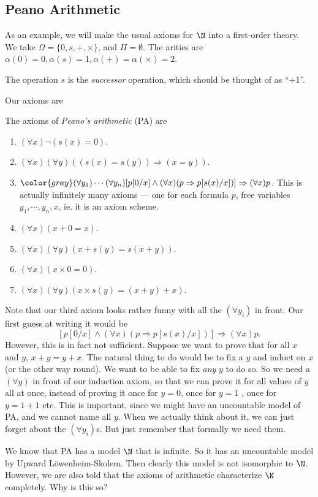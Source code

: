 \documentclass[a4paper]{article}
\begin{document}
\subsection{Peano Arithmetic}
As an example, we will make the usual axioms for $\N$ into a first-order theory. We take $\Omega = \{0, s, +, \times\}$, and $\Pi = \emptyset$. The arities are $\alpha(0) = 0, \alpha(s) = 1, \alpha(+) = \alpha(\times) = 2$.

The operation $s$ is the \emph{successor} operation, which should be thought of as ``+1''.

Our axioms are
\begin{defi}
  The axioms of \emph{Peano's arithmetic} (PA) are
  \begin{enumerate}
    \item $(\forall x)\neg(s(x) = 0)$.
    \item $(\forall x)(\forall y)((s(x) = s(y)) \Rightarrow (x = y))$.
    \item ${\color{gray}(\forall y_1)\cdots (\forall y_n)}[p[0/x] \wedge (\forall x)(p \Rightarrow p[s(x)/x])]\Rightarrow (\forall x)p$. This is actually infinitely many axioms --- one for each formula $p$, free variables $y_1, \cdots, y_n, x$, ie. it is an axiom scheme.
    \item $(\forall x)(x + 0 = x)$.
    \item $(\forall x)(\forall y)(x + s(y) = s(x + y))$.
    \item $(\forall x)(x \times 0 = 0)$.
    \item $(\forall x)(\forall y)(x\times s(y) = (x + y) + x)$.
  \end{enumerate}
  Note that our third axiom looks rather funny with all the $(\forall y_i)$ in front. Our first guess at writing it would be
  \[
    [p[0/x] \wedge (\forall x)(p\Rightarrow p[s(x)/x])] \Rightarrow (\forall x)p.
  \]
  However, this is in fact not sufficient. Suppose we want to prove that for all $x$ and $y$, $x + y = y + x$. The natural thing to do would be to fix a $y$ and induct on $x$ (or the other way round). We want to be able to fix \emph{any} $y$ to do so. So we need a $(\forall y)$ in front of our induction axiom, so that we can prove it for all values of $y$ all at once, instead of proving it once for $y = 0$, once for $y = 1$ , once for $y = 1 + 1$ etc. This is important, since we might have an uncountable model of PA, and we cannot name all $y$. When we actually think about it, we can just forget about the $(\forall y_i)$s. But just remember that formally we need them.
\end{defi}
We know that PA has a model $\N$ that is infinite. So it has an uncountable model by Upward L\"owenheim-Skolem. Then clearly this model is not isomorphic to $\N$. However, we are also told that the axioms of arithmetic characterize $\N$ completely. Why is this so?
\end{document}
